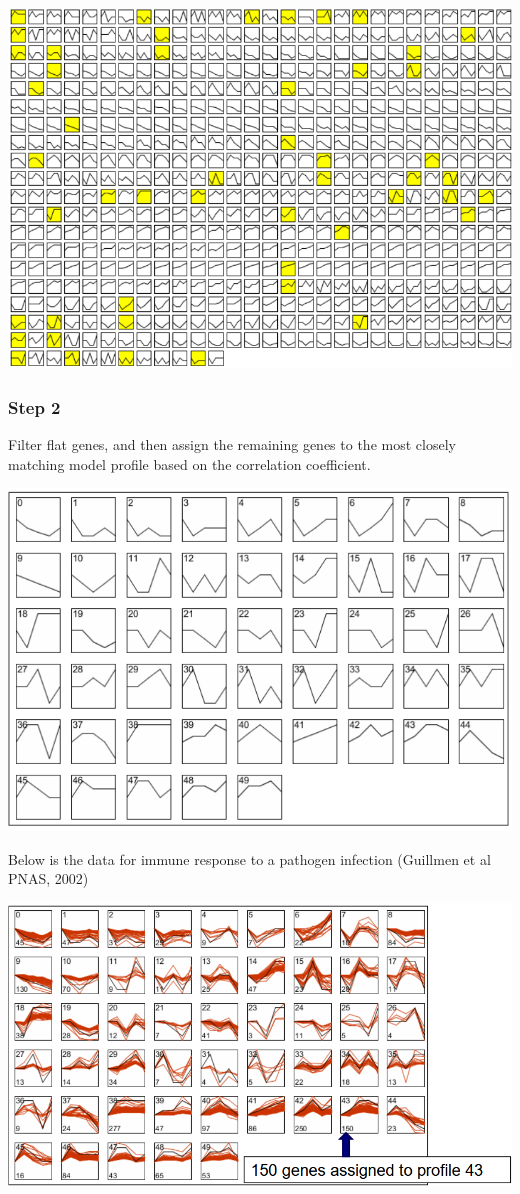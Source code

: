 \documentclass[10pt]{article}
\begin{document}
\begin{center}
    \includegraphics*[width=\textwidth]{W6_44.png}
\end{center}
\subsubsection*{Step 2}
Filter flat genes, and then assign the remaining genes to the most closely matching model profile based on the correlation coefficient.
\begin{center}
    \includegraphics*[width=\textwidth]{W6_45.png}
\end{center}
Below is the data for immune response to a pathogen infection (Guillmen et al PNAS, 2002)
\begin{center}
    \includegraphics*[width=\textwidth]{W6_46.png}
\end{center}
\end{document}
